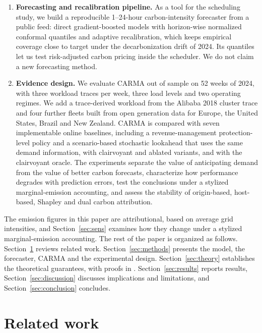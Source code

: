 \begin{enumerate}
\item \textbf{Forecasting and recalibration pipeline.} As a tool for the scheduling study, we build a reproducible 1--24-hour carbon-intensity forecaster from a public feed: direct gradient-boosted models with horizon-wise normalized conformal quantiles and adaptive recalibration, which keeps empirical coverage close to target under the decarbonization drift of 2024. Its quantiles let us test risk-adjusted carbon pricing inside the scheduler. We do not claim a new forecasting method.
\item \textbf{Evidence design.} We evaluate CARMA out of sample on 52 weeks of 2024, with three workload traces per week, three load levels and two operating regimes. We add a trace-derived workload from the Alibaba 2018 cluster trace and four further fleets built from open generation data for Europe, the United States, Brazil and New Zealand. CARMA is compared with seven implementable online baselines, including a revenue-management protection-level policy and a scenario-based stochastic lookahead that uses the same demand information, with clairvoyant and ablated variants, and with the clairvoyant oracle. The experiments separate the value of anticipating demand from the value of better carbon forecasts, characterize how performance degrades with prediction errors, test the conclusions under a stylized marginal-emission accounting, and assess the stability of origin-based, host-based, Shapley and dual carbon attribution.
\end{enumerate}

The emission figures in this paper are attributional, based on average grid intensities, and Section~\ref{sec:sens} examines how they change under a stylized marginal-emission accounting. The rest of the paper is organized as follows. Section~\ref{sec:related} reviews related work. Section~\ref{sec:methods} presents the model, the forecaster, CARMA and the experimental design. Section~\ref{sec:theory} establishes the theoretical guarantees, with proofs in . Section~\ref{sec:results} reports results, Section~\ref{sec:discussion} discusses implications and limitations, and Section~\ref{sec:conclusion} concludes.

\section{Related work}\label{sec:related}

